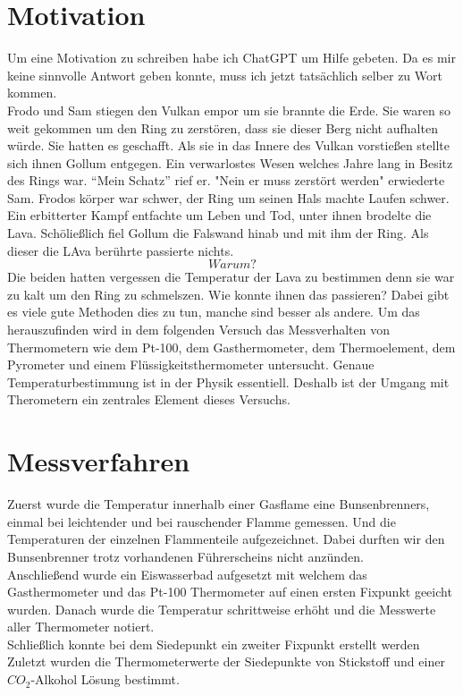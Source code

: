 \section{Motivation}
Um eine Motivation zu schreiben habe ich ChatGPT um Hilfe gebeten. 
Da es mir keine sinnvolle Antwort geben konnte,
muss ich jetzt tatsächlich selber zu Wort kommen.\\
Frodo und Sam stiegen den Vulkan empor um sie brannte die Erde. Sie waren so weit gekommen um den Ring zu zerstören, dass
sie dieser Berg nicht aufhalten würde. Sie hatten es geschafft.
Als sie in das Innere des Vulkan vorstießen stellte sich ihnen Gollum entgegen.
Ein verwarlostes Wesen welches Jahre lang in Besitz des Rings war. ``Mein Schatz'' rief er.
"Nein er muss zerstört werden" erwiederte Sam. Frodos körper war schwer, der Ring um seinen Hals machte Laufen schwer.
Ein erbitterter Kampf entfachte um Leben und Tod, unter ihnen brodelte die Lava. Schöließlich fiel Gollum die Falswand hinab und mit ihm der Ring.
Als dieser die LAva berührte passierte nichts.\\
\[Warum ?\]
Die beiden hatten vergessen die Temperatur der Lava zu bestimmen denn sie war zu kalt um den Ring zu schmelszen. Wie konnte ihnen das passieren? Dabei gibt
es viele gute Methoden dies zu tun, manche sind besser als andere. Um das herauszufinden
wird in dem folgenden Versuch das Messverhalten von Thermometern wie dem Pt-100, dem Gasthermometer, dem Thermoelement, dem Pyrometer und einem Flüssigkeitsthermometer untersucht.
Genaue Temperaturbestimmung ist in der Physik essentiell. Deshalb ist der Umgang mit Therometern ein zentrales Element dieses Versuchs.

\section{Messverfahren}

Zuerst wurde die Temperatur innerhalb einer Gasflame eine Bunsenbrenners, einmal bei leichtender und bei rauschender Flamme gemessen.
Und die Temperaturen der einzelnen Flammenteile aufgezeichnet.
Dabei durften wir den Bunsenbrenner trotz vorhandenen Führerscheins nicht anzünden.\\ \smallskip
Anschließend wurde ein Eiswasserbad aufgesetzt mit welchem das Gasthermometer und das Pt-100 Thermometer auf einen ersten
Fixpunkt geeicht wurden. Danach wurde die Temperatur schrittweise erhöht und die Messwerte aller Thermometer notiert.\\
Schließlich konnte bei dem Siedepunkt ein zweiter Fixpunkt erstellt werden\\ \smallskip
Zuletzt wurden die Thermometerwerte der Siedepunkte von Stickstoff und einer $CO_2$-Alkohol Lösung bestimmt.

